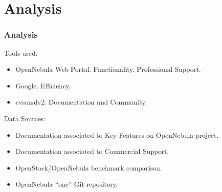 \section{Analysis}

\begin{frame}[allowframebreaks]
\frametitle{Analysis}
Tools used:
\begin{itemize}\itemsep0pt
\item{OpenNebula Web Portal}. Functionality. Professional Support.
\item{Google}. Efficiency.
\item{cvsanaly2}. Documentation and Community.
\end{itemize}
Data Sources:
\begin{itemize}\itemsep0pt
\item{Documentation associated to Key Features on OpenNebula project}.
\item{Documentation associated to Commercial Support}.
\item{OpenStack/OpenNebula benchmark comparison}.
\item{OpenNebula ``one'' Git repository}.
\end{itemize}

\end{frame}
